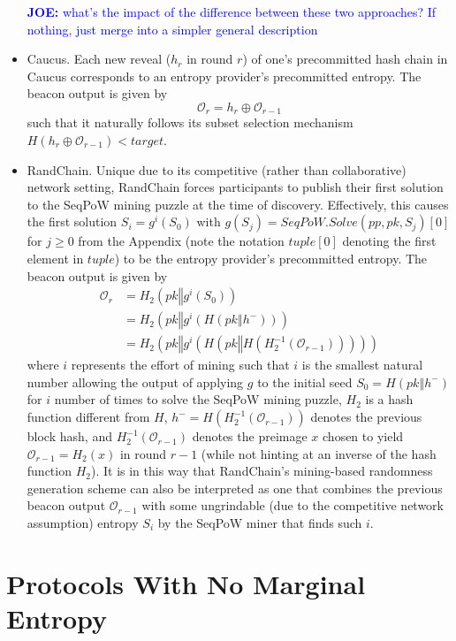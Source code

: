 \documentclass[letterpaper,twocolumn,10pt]{article}
\theoremstyle{definition}
\theoremstyle{remark}
\newcommand{\joenote}[1]{\textcolor{blue}{\textbf{JOE:} #1}}
\begin{document}
\begin{itemize}
\joenote{what's the impact of the difference between these two approaches? If nothing, just merge into a simpler general description}
\item Caucus. Each new reveal ($h_r$ in round $r$) of one's precommitted hash chain in Caucus corresponds to an entropy provider's precommitted entropy. The beacon output is given by
\[
\mathcal{O}_r = h_r \oplus \mathcal{O}_{r - 1}
\]
such that it naturally follows its subset selection mechanism $H(h_r \oplus \mathcal{O}_{r - 1}) < target$.
\item RandChain. Unique due to its competitive (rather than collaborative) network setting, RandChain forces participants to publish their first solution to the SeqPoW mining puzzle at the time of discovery. Effectively, this causes the first solution $S_i = g^i(S_0)$ with $g(S_j) = SeqPoW.Solve(pp, pk, S_j)[0]$ for $j \geq 0$ from the Appendix (note the notation $tuple[0]$ denoting the first element in $tuple$) to be the entropy provider's precommitted entropy. The beacon output is given by
\begin{align*}
\mathcal{O}_r &= H_2(pk \mathbin\Vert g^i(S_0))\\
&= H_2(pk \mathbin\Vert g^i(H(pk \mathbin\Vert h^-)))\\
&= H_2(pk \mathbin\Vert g^i(H(pk \mathbin\Vert H(H_2^{-1}(\mathcal{O}_{r - 1})))))
\end{align*}
where $i$ represents the effort of mining such that $i$ is the smallest natural number allowing the output of applying $g$ to the initial seed $S_0 = H(pk \mathbin\Vert h^-)$ for $i$ number of times to solve the SeqPoW mining puzzle, $H_2$ is a hash function different from $H$, $h^- = H(H_2^{-1}(\mathcal{O}_{r - 1}))$ denotes the previous block hash, and $H_2^{-1}(\mathcal{O}_{r - 1})$ denotes the preimage $x$ chosen to yield $\mathcal{O}_{r - 1} = H_2(x)$ in round $r - 1$ (while not hinting at an inverse of the hash function $H_2$). It is in this way that RandChain's mining-based randomness generation scheme can also be interpreted as one that combines the previous beacon output $\mathcal{O}_{r - 1}$ with some ungrindable (due to the competitive network assumption) entropy $S_i$ by the SeqPoW miner that finds such $i$.
\end{itemize}

\section{Protocols With No Marginal Entropy}
\label{section:dvrf}
\end{document}
